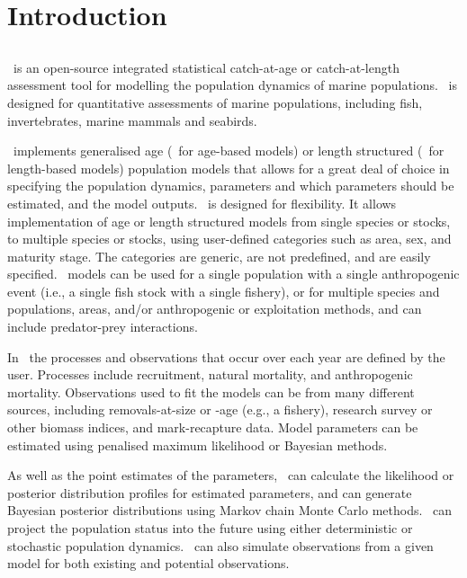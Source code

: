\section{Introduction\label{sec:Introduction}}

\subsection{}

\CNAME\ is an open-source integrated statistical catch-at-age or catch-at-length assessment tool for modelling the population dynamics of marine populations. \CNAME\ is designed for quantitative assessments of marine populations, including fish, invertebrates, marine mammals and seabirds.

\CNAME\ implements generalised age (\CNAME\ for age-based models) or length structured (\CNAME\ for length-based models) population models that allows for a great deal of choice in specifying the population dynamics, parameters and which parameters should be estimated, and the model outputs. \CNAME\ is designed for flexibility. It allows implementation of age or length structured models from single species or stocks, to multiple species or stocks, using user-defined categories such as area, sex, and maturity stage. The categories are generic, are not predefined, and are easily specified. \CNAME\ models can be used for a single population with a single anthropogenic event (i.e., a single fish stock with a single fishery), or for multiple species and populations, areas, and/or anthropogenic or exploitation methods, and can include predator-prey interactions.

In \CNAME\ the processes and observations that occur over each year are defined by the user. Processes include recruitment, natural mortality, and anthropogenic mortality. Observations used to fit the models can be from many different sources, including removals-at-size or -age (e.g., a fishery), research survey or other biomass indices, and mark-recapture data. Model parameters can be estimated using penalised maximum likelihood or Bayesian methods.

As well as the point estimates of the parameters, \CNAME\ can calculate the likelihood or posterior distribution profiles for estimated parameters, and can generate Bayesian posterior distributions using Markov chain Monte Carlo methods. \CNAME\ can project the population status into the future using either deterministic or stochastic population dynamics. \CNAME\ can also simulate observations from a given model for both existing and potential observations.

